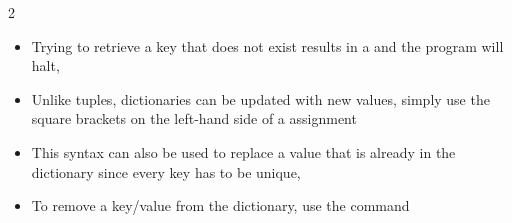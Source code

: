 \documentclass[letterpaper,10pt,english,openany]{sphinxmanual}
\begin{document}
\begin{sphinxVerbatim}[commandchars=\\\{\}]
2
\end{sphinxVerbatim}
\begin{itemize}
\item {} 
Trying to retrieve a key that does not exist results in a 
and the program will halt,

\end{itemize}

\begin{sphinxVerbatim}[commandchars=\\\{\}]
\PYG{p}{[}\PYG{p}{]}   
\end{sphinxVerbatim}
\begin{itemize}
\item {} 
Unlike tuples, dictionaries can be updated with new values, simply
use the square brackets on the left-hand side of a assignment

\item {} 
This syntax can also be used to replace a value that is already in
the dictionary since every key has to be unique,

\end{itemize}

\begin{sphinxVerbatim}[commandchars=\\\{\}]
        
        
\PYG{p}{[}\PYG{p}{]}  
\PYG{p}{[}\PYG{p}{]}     
\PYG{p}{[}\PYG{p}{]} \PYG{p}{[}\PYG{p}{]}
\end{sphinxVerbatim}
\begin{itemize}
\item {} 
To remove a key/value from the dictionary, use the  command

\end{itemize}
\end{document}
